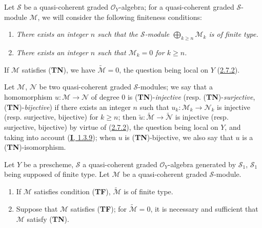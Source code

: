\begin{env}[3.4.2]
\label{II.3.4.2}
Let $\mathcal{S}$ be a quasi-coherent graded $\mathcal{O}_Y$-algebra; for
a quasi-coherent graded $\mathcal{S}$-module $\mathcal{M}$, we will consider
the following finiteness conditions:
\begin{enumerate}
  \item[(\textbf{TF})] \emph{There exists an integer $n$ such that the
    $\mathcal{S}$-module $\bigoplus_{k\geq n}\mathcal{M}_k$ is of finite type.}
  \item[(\textbf{TN})] \emph{There exists an integer $n$ such that
    $\mathcal{M}_k=0$ for $k\geq n$.}
\end{enumerate}
If $\mathcal{M}$ satisfies (\textbf{TN}), we have
$\widetilde{\mathcal{M}}=0$, the question being local on $Y$
(\hyperref[II.2.7.2]{2.7.2}).

Let $\mathcal{M}$, $\mathcal{N}$ be two quasi-coherent graded
$\mathcal{S}$-modules; we say that a homomorphism
$u:\mathcal{M}\to\mathcal{N}$ of degree $0$ is
(\textbf{TN})-\emph{injective} (resp. (\textbf{TN})-\emph{surjective},
(\textbf{TN})-\emph{bijective}) if there exists an integer $n$ such that
$u_k:\mathcal{M}_k\to\mathcal{N}_k$ is injective (resp. surjective, bijective)
for $k\geq n$; then
$\widetilde{u}:\widetilde{\mathcal{M}}\to\widetilde{\mathcal{N}}$ is injective
(resp. surjective, bijective) by virtue of
(\hyperref[II.2.7.2]{2.7.2}), the question being local on $Y$, and taking
into account (\hyperref[I.1.3.9]{\textbf{I}, 1.3.9}); when $u$ is
(\textbf{TN})-bijective, we also say that $u$ is a
(\textbf{TN})-isomorphism.
\end{env}

\begin{proposition}[3.4.3]
\label{II.3.4.3}
Let $Y$ be a prescheme, $\mathcal{S}$ a quasi-coherent graded
$\mathcal{O}_Y$-algebra generated by $\mathcal{S}_1$, $\mathcal{S}_1$ being
supposed of finite type. Let $\mathcal{M}$ be a quasi-coherent graded
$\mathcal{S}$-module.
\begin{enumerate}
  \item[\rm(i)] If $\mathcal{M}$ satisfies condition \textup{(\textbf{TF})},
    $\widetilde{\mathcal{M}}$ is of finite type.
  \item[\rm(ii)] Suppose that $\mathcal{M}$ satisfies \textup{(\textbf{TF})}; for
    $\widetilde{\mathcal{M}}=0$, it is necessary and sufficient that
    $\mathcal{M}$ satisfy \textup{(\textbf{TN})}.
\end{enumerate}
\end{proposition}

